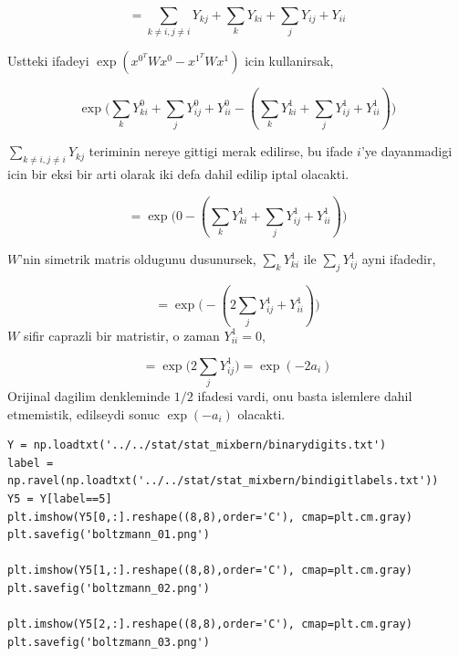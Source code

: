 \documentclass[12pt,fleqn]{article}\usepackage{../common}
\begin{document}
$$ 
= \sum_{k \ne i,j \ne i} Y_{kj} + \sum_{k}  Y_{ki} + \sum_{j} Y_{ij} + Y_{ii}
$$

Ustteki ifadeyi $ \exp( x^{0^T}Wx^0 -   x^{1^T}Wx^1 )$ icin kullanirsak,

$$ 
\exp 
\big( 
\sum_{k}  Y_{ki}^0 + \sum_{j} Y_{ij}^0 + Y_{ii}^0 - 
( \sum_{k}  Y_{ki}^1 + \sum_{j} Y_{ij}^1 + Y_{ii}^1  )
\big)
 $$

$\sum_{k \ne i,j \ne i} Y_{kj}$ teriminin nereye gittigi merak edilirse,
bu ifade $i$'ye dayanmadigi icin bir eksi bir arti olarak iki defa dahil
edilip iptal olacakti. 

$$ 
= \exp \big( 
0 - ( \sum_{k}  Y_{ki}^1 + \sum_{j} Y_{ij}^1 + Y_{ii}^1  ) 
\big)
 $$

$W$'nin simetrik matris oldugunu dusunursek, $\sum_{k}  Y_{ki}^1$ ile $\sum_{j}Y_{ij}^1$ ayni ifadedir, 

$$ 
= \exp \big( 
- ( 2 \sum_{j} Y_{ij}^1 + Y_{ii}^1  ) 
\big)
 $$
$W$ sifir caprazli bir matristir, o zaman $Y_{ii}^1=0$, 

$$ 
= \exp \big( 2 \sum_{j} Y_{ij}^1 \big) = \exp (- 2 a_i )
 $$
Orijinal dagilim denkleminde $1/2$ ifadesi vardi, onu basta islemlere dahil
etmemistik, edilseydi sonuc  $\exp (- a_i)$ olacakti. 






















\begin{verbatim}
Y = np.loadtxt('../../stat/stat_mixbern/binarydigits.txt')
label = np.ravel(np.loadtxt('../../stat/stat_mixbern/bindigitlabels.txt'))
Y5 = Y[label==5]
plt.imshow(Y5[0,:].reshape((8,8),order='C'), cmap=plt.cm.gray)
plt.savefig('boltzmann_01.png')

plt.imshow(Y5[1,:].reshape((8,8),order='C'), cmap=plt.cm.gray)
plt.savefig('boltzmann_02.png')

plt.imshow(Y5[2,:].reshape((8,8),order='C'), cmap=plt.cm.gray)
plt.savefig('boltzmann_03.png')
\end{verbatim}
\end{document}

